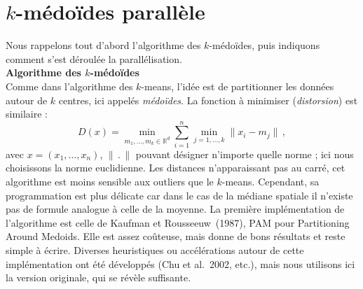 \documentclass[12pt]{article}
\begin{document}
\section{$k$-médoïdes parallèle}

Nous rappelons tout d'abord l'algorithme des $k$-médoïdes, puis indiquons comment s'est déroulée la parallélisation.\\

\noindent \textbf{Algorithme des $k$-médoïdes}\\
Comme dans l'algorithme des $k$-means, l'idée est de partitionner les données autour de $k$ centres, ici appelés \emph{médoïdes}. 
La fonction à minimiser (\emph{distorsion}) est similaire :
$$D(x) = \min_{m_1,\dots,m_k \in \mathbb{R}^d} \sum_{i=1}^{n} \min_{j=1,\dots,k} \| x_i - m_j \| \, ,$$
avec $x = (x_1,\dots,x_n)$, $\|\,.\,\|$ pouvant désigner n'importe quelle norme ; ici nous choisissons la norme euclidienne. 
Les distances n'apparaissant pas au carré, cet algorithme est moins sensible aux outliers que le $k$-means. 
Cependant, sa programmation est plus délicate car dans le cas de la médiane spatiale il n'existe pas de formule analogue à celle de la moyenne. 
La première implémentation de l'algorithme est celle de Kaufman et Rousseeuw~(1987), PAM pour Partitioning Around Medoids. 
Elle est assez coûteuse, mais donne de bons résultats et reste simple à écrire. Diverses heuristiques ou accélérations autour de cette implémentation 
ont été développés (Chu et al.~2002, etc.), mais nous utilisons ici la version originale, qui se révèle suffisante.\\
\end{document}
